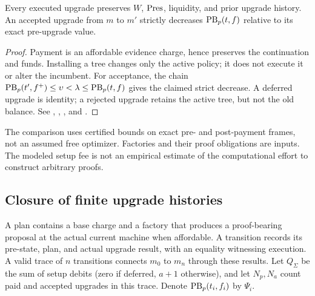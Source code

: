 \begin{theorem}\label{thm:policy-local}
Every executed upgrade preserves $W$, $\operatorname{Pres}$, liquidity, and prior upgrade history. An accepted upgrade from $m$ to $m'$ strictly decreases $\operatorname{PB}_p(t,f)$ relative to its exact pre-upgrade value.
\end{theorem}
\begin{proof}
Payment is an affordable evidence charge, hence preserves the continuation and funds. Installing a tree changes only the active policy; it does not execute it or alter the incumbent. For acceptance, the chain $\operatorname{PB}_p(t',f^+)\le\upsilon<\lambda\le\operatorname{PB}_p(t,f)$ gives the claimed strict decrease. A deferred upgrade is identity; a rejected upgrade retains the active tree, but not the old balance. See , , , and .
\end{proof}
The comparison uses certified bounds on exact pre- and post-payment frames, not an assumed free optimizer. Factories and their proof obligations are inputs. The modeled setup fee is not an empirical estimate of the computational effort to construct arbitrary proofs.

\subsection{Closure of finite upgrade histories}
A plan contains a base charge and a factory that produces a proof-bearing proposal at the actual current machine when affordable. A transition records its pre-state, plan, and actual upgrade result, with an equality witnessing execution. A valid trace of $n$ transitions connects $m_0$ to $m_n$ through these results. Let $Q_\Sigma$ be the sum of setup debits (zero if deferred, $a+1$ otherwise), and let $N_p,N_a$ count paid and accepted upgrades in this trace. Denote $\operatorname{PB}_p(t_i,f_i)$ by $\Psi_i$.

